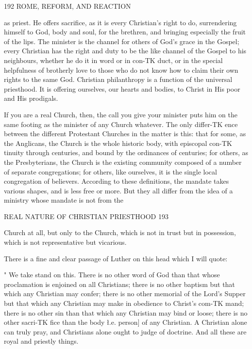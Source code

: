 \documentclass[12pt,a5paper,twoside]{book}
\begin{document}
{192 ROME, REFORM, AND REACTION 

as priest. He offers sacrifice, as it is every Christian's 
right to do, surrendering himself to God, body and soul, 
for the brethren, and bringing especially the fruit of 
the lips. The minister is the channel for others of 
God's grace in the Gospel; every Christian has the 
right and duty to be the like channel of the Gospel to 
his neighbours, whether he do it in word or in con-TK
duct, or in the special helpfulness of brotherly love to 
those who do not know how to claim their own rights 
to the same God. Christian philanthropy is a function 
of the universal priesthood. It is offering ourselves, 
our hearts and bodies, to Christ in His poor and His 
prodigals. 

If you are a real Church, then, the call you give 
your minister puts him on the same footing as the 
minister of any Church whatever. The only differ-TK
ence between the different Protestant Churches in the 
matter is this: that for some, as the Anglicans, the 
Church is the whole historic body, with episcopal con-TK
tinuity through centuries, and bound by the ordinances 
of centuries; for others, as the Presbyterians, the Church 
is the existing community composed of a number of 
separate congregations; for others, like ourselves, it is 
the single local congregation of believers. According 
to these definitions, the mandate takes various shapes, 
and is less free or more. But they all differ from the 
idea of a ministry whose mandate is not from the 



REAL NATURE OF CHRISTIAN PRIESTHOOD 193 

Church at all, but only to the Church, which is not in 
trust but in possession, which is not representative but 
vicarious. 

There is a fine and clear passage of Luther on this 
head which I will quote: 

" We take stand on this. There is no other word 
of God than that whose proclamation is enjoined on 
all Christians; there is no other baptism but that 
which any Christian may confer; there is no other 
memorial of the Lord's Supper but that which any 
Christian may make in obedience to Christ's com-TK
mand; there is no other sin than that which any 
Christian may bind or loose; there is no other sacri-TK
fice than the body \l.e. person] of any Christian. A 
Christian alone can truly pray, and Christians alone 
ought to judge of doctrine. And all these are royal 
and priestly things. 

}
\end{document}
